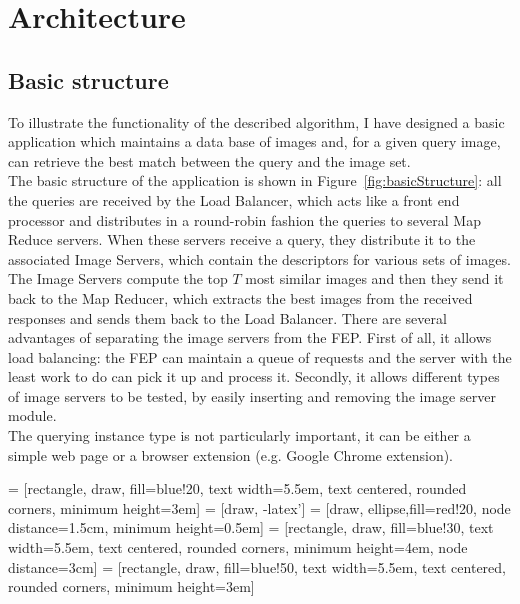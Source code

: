 \chapter{Architecture}
\label{chap:implementation}

\section{Basic structure}

To illustrate the functionality of the described algorithm, I have designed a basic application which maintains a data base of images and, for a given query image, can retrieve the best match between
the query and the image set.\\
The basic structure of the application is shown in Figure~\ref{fig:basicStructure}: all the queries are received by the Load Balancer, which acts like a front end processor and distributes in a round-robin fashion the queries to several Map Reduce servers. When these servers receive a query, they distribute it to the associated Image Servers, which contain the descriptors for various sets of images. The Image Servers compute the top $T$ most similar images and then they send it back to the Map Reducer, which extracts the best images from the received responses and sends them back to the Load Balancer. There are several advantages of separating the image servers from the FEP. First of all, it allows load balancing: the FEP can maintain a queue of requests and the server with the least work to do can pick it up and process it. Secondly, it allows different types of image servers to be tested, by easily inserting and removing the image server module.\\
The querying instance type is not particularly important, it can be either a simple web page or a browser extension (e.g. Google Chrome extension).

 = [rectangle, draw, fill=blue!20, 
    text width=5.5em, text centered, rounded corners, minimum height=3em]
 = [draw, -latex']
 = [draw, ellipse,fill=red!20, node distance=1.5cm,
    minimum height=0.5em]
 = [rectangle, draw, fill=blue!30, 
    text width=5.5em, text centered, rounded corners, minimum height=4em, node distance=3cm]
 = [rectangle, draw, fill=blue!50, 
    text width=5.5em, text centered, rounded corners, minimum height=3em]
    
